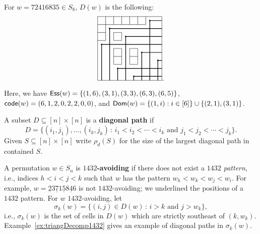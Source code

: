 \documentclass[12pt]{amsart}
\theoremstyle{definition}
\newenvironment{example}
  {\pushQED{\qed}\renewcommand{\qedsymbol}{$\diamondsuit$}\examplex}
  {\popQED\endexamplex}
\theoremstyle{remark}
\numberwithin{equation}{section}
\newcommand{\code}{{\sf code}}
\newcommand\mydef[1]{{\bf #1}}
\newcommand{\Ess}{{\sf Ess}}
\newcommand{\Sym}{S}
\newcommand{\maxsizediag}{\rho_d}
\begin{document}
\begin{example}\label{ex:Rothe}
For 
$w=72416835 \in {S}_{8}$, $D(w)$ is the following: 
\[
\begin{tikzpicture}[scale=.4]
\draw (0,0) rectangle (8,8);

\draw[line width = .1ex] (0,7)--(6,7);
\draw[line width = .1ex] (1,8) -- (1,5);
\draw[line width = .1ex] (2,8) -- (2,7);
\draw[line width = .1ex] (3,8) -- (3,7);
\draw[line width = .1ex] (4,8) -- (4,7);
\draw[line width = .1ex] (5,8) -- (5,7);
\draw[line width = .1ex] (6,8) -- (6,7);

\draw[line width = .1ex] (0,6) -- (1,6);
\draw[line width = .1ex] (0,5) -- (1,5);

\draw (2,5) rectangle (3,6);

\draw (2,2) rectangle (3,4);
\draw[line width = .1ex] (2,3) -- (3,3);


\draw (4,2) rectangle (5,4);
\draw[line width = .1ex] (4,3) -- (5,3);



\filldraw (6.5,7.5) circle (.5ex);
\draw[line width = .2ex] (6.5,0) -- (6.5,7.5) -- (8,7.5);
\filldraw (1.5,6.5) circle (.5ex);
\draw[line width = .2ex] (1.5,0) -- (1.5,6.5) -- (8,6.5);
\filldraw (3.5,5.5) circle (.5ex);
\draw[line width = .2ex] (3.5,0) -- (3.5,5.5) -- (8,5.5);
\filldraw (0.5,4.5) circle (.5ex);
\draw[line width = .2ex] (0.5,0) -- (0.5,4.5) -- (8,4.5);
\filldraw (5.5,3.5) circle (.5ex);
\draw[line width = .2ex] (5.5,0) -- (5.5,3.5) -- (8,3.5);
\filldraw (7.5,2.5) circle (.5ex);
\draw[line width = .2ex] (7.5,0) -- (7.5,2.5) -- (8,2.5);
\filldraw (2.5,1.5) circle (.5ex);
\draw[line width = .2ex] (2.5,0) -- (2.5,1.5) -- (8,1.5);
\filldraw (4.5,0.5) circle (.5ex);
\draw[line width = .2ex] (4.5,0) -- (4.5,0.5) -- (8,0.5);
\end{tikzpicture}.
\]
Here, we have
$\Ess(w)=\{(1,6),(3,1),(3,3),(6,3),(6,5)\}$, $\code(w)=(6,1,2,0,2,2,0,0)$, and ${\sf Dom}(w)=\{(1,i):i\in [6]\}\cup \{(2,1), (3,1)\}$.
\end{example}



A subset $D\subseteq [n]\times[n]$ is a \mydef{diagonal path} if \[D=\{(i_1,j_1),\ldots,(i_k,j_k)\,:  \, i_1<i_2<\cdots <i_k \text{ and } j_1<j_2<\cdots <j_k\}.\]
 Given $S\subseteq [n]\times[n]$ write $\maxsizediag(S)$ for the size of the largest diagonal path in contained $S$.
 
 A permutation $w\in \Sym_n$ is \mydef{$1432$-avoiding} if there does not exist a \emph{$1432$ pattern}, i.e., indices
$h<i<j<k$ such that $w$ has the pattern $w_h<w_k<w_j<w_i$. 
For example, $w=\underline{2}3\underline{7}1\underline{5}8\underline{4}6$ is not $1432$-avoiding; we underlined the positions of a $1432$ pattern. 
For $w$ $1432$-avoiding, let 
\[\sigma_k(w)=\{ (i,j)\in D(w) \,:  \, i>k \text{ and } j>w_k\},\] i.e., $\sigma_k(w)$ is the set of cells in $D(w)$ which are strictly southeast of $(k,w_k)$.  Example~\ref{ex:triangDecomp1432} gives an example of diagonal paths in $\sigma_k(w)$.
\end{document}
